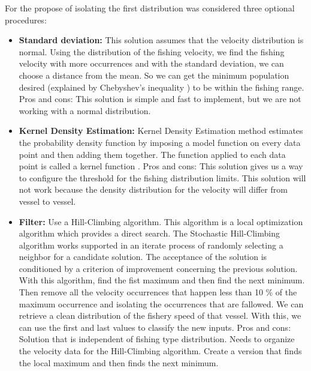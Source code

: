 For the propose of isolating the first distribution was considered three optional procedures:
\begin{itemize}
\item \textbf{Standard deviation:}
This solution assumes that the velocity distribution is normal. Using the distribution of the fishing velocity, we find the fishing velocity with more occurrences and with the standard deviation, we can choose a distance from the mean. So we can get the minimum population desired (explained by Chebyshev's inequality \cite{Chebyshevinequality}) to be within the fishing range. \\
Pros and cons: This solution is simple and fast to implement, but we are not working with a normal distribution.

\item \textbf{Kernel Density Estimation:}
Kernel Density Estimation method estimates the probability density function by imposing a model function on every data point and then adding them together. The function applied to each data point is called a kernel function \cite{KernelDensityEstimation}.
Pros and cons: This solution gives us a way to configure the threshold for the fishing distribution limits. This solution will not work because the density distribution for the velocity will differ from vessel to vessel. 

\item \textbf{Filter:}
Use a Hill-Climbing algorithm\cite{Kvasnicka1995HillCW}. This algorithm is a local optimization algorithm which provides a direct search. The Stochastic Hill-Climbing algorithm works supported in an iterate process of randomly selecting a neighbor for a candidate solution. The acceptance of the solution is conditioned by a criterion of improvement concerning the previous solution. With this algorithm, find the fist maximum and then find the next minimum.
Then remove all the velocity occurrences that happen less than 10 \% of the maximum occurrence and isolating the occurrences that are fallowed. We can retrieve a clean distribution of the fishery speed of that vessel. With this, we can use the first and last values to classify the new inputs. 
Pros and cons: Solution that is independent of fishing type distribution. Needs to organize the velocity data for the Hill-Climbing algorithm. Create a version that finds the local maximum and then finds the next minimum.
\end{itemize}

